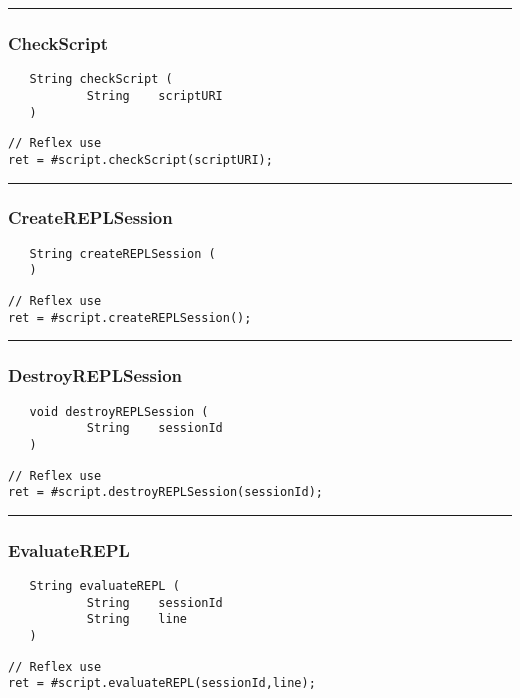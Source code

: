 \rule{15cm}{2pt}
\subsubsection{CheckScript}
\label{Api:CheckScript}
\begin{verbatim}
   String checkScript (
           String    scriptURI
   )
\end{verbatim}
\begin{lstlisting}[language=reflex]
// Reflex use
ret = #script.checkScript(scriptURI);
\end{lstlisting}



\rule{15cm}{2pt}
\subsubsection{CreateREPLSession}
\label{Api:CreateREPLSession}
\begin{verbatim}
   String createREPLSession (
   )
\end{verbatim}
\begin{lstlisting}[language=reflex]
// Reflex use
ret = #script.createREPLSession();
\end{lstlisting}



\rule{15cm}{2pt}
\subsubsection{DestroyREPLSession}
\label{Api:DestroyREPLSession}
\begin{verbatim}
   void destroyREPLSession (
           String    sessionId
   )
\end{verbatim}
\begin{lstlisting}[language=reflex]
// Reflex use
ret = #script.destroyREPLSession(sessionId);
\end{lstlisting}



\rule{15cm}{2pt}
\subsubsection{EvaluateREPL}
\label{Api:EvaluateREPL}
\begin{verbatim}
   String evaluateREPL (
           String    sessionId
           String    line
   )
\end{verbatim}
\begin{lstlisting}[language=reflex]
// Reflex use
ret = #script.evaluateREPL(sessionId,line);
\end{lstlisting}



